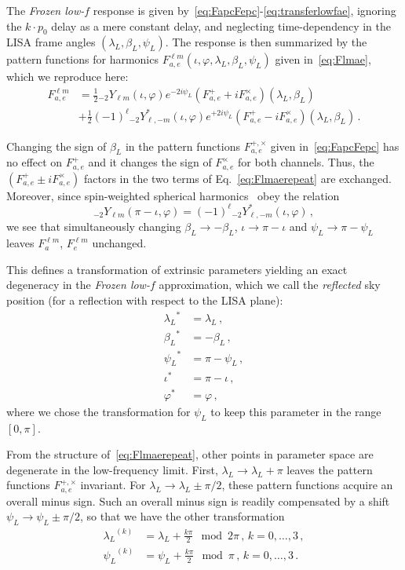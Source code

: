\documentclass[aps,showpacs,twocolumn,prd,superscriptaddress,nofootinbib]{revtex4-1}
\newcommand{\be}{\begin{equation}}
\newcommand{\ee}{\end{equation}}
\newcommand{\nn}{\nonumber}
\newcommand\betaL{{\beta_{L}}}
\newcommand\lambdaL{{\lambda_{L}}}
\newcommand\psiL{{\psi_{L}}}
\newcommand{\sYlm}{{}_{-2}Y_{\ell m}}
\newcommand{\sYlminusmstar}{{}_{-2}Y_{\ell, -m}^{*}}
\begin{document}
The \textit{Frozen low-$f$} response is given by~\eqref{eq:FapcFepc}-\eqref{eq:transferlowfae}, ignoring the $k\cdot p_{0}$ delay as a mere constant delay, and neglecting time-dependency in the LISA frame angles $(\lambda_{L}, \beta_{L}, \psi_{L})$. The response is then summarized by the pattern functions for harmonics $F^{\ell m}_{a,e} (\iota, \varphi, \lambda_{L}, \beta_{L}, \psi_{L})$ given in~\eqref{eq:Flmae}, which we reproduce here:
\begin{align}\label{eq:Flmaerepeat}
	F_{a,e}^{\ell m} &= \frac{1}{2} \sYlm (\iota, \varphi) e^{-2 i \psi_{L}} \left( F_{a,e}^{+} + i F_{a,e}^{\times}\right) (\lambda_{L}, \beta_{L}) \nn\\
	& + \frac{1}{2} (-1)^{\ell} \sYlminusmstar (\iota, \varphi) e^{+2 i \psi_{L}} \left( F_{a,e}^{+} - i F_{a,e}^{\times} \right) (\lambda_{L}, \beta_{L}) \,.
\end{align}

Changing the sign of $\beta_{L}$ in the pattern functions $F_{a,e}^{+,\times}$ given in~\eqref{eq:FapcFepc} has no effect on $F_{a,e}^{+}$ and it changes the sign of $F_{a,e}^{\times}$ for both channels.
Thus, the $\left( F_{a,e}^{+} \pm i F_{a,e}^{\times}\right)$ factors in the two terms of Eq.~\eqref{eq:Flmaerepeat} are exchanged.
Moreover, since spin-weighted spherical harmonics~\cite{Goldberg+67} obey the relation
\be
	\sYlm (\pi - \iota, \varphi) = (-1)^{\ell} \sYlminusmstar (\iota, \varphi) \,,
\ee
we see that simultaneously changing $\beta_{L} \rightarrow -\beta_{L}$, $\iota \rightarrow \pi-\iota$ and $\psi_{L} \rightarrow \pi - \psi_{L}$ leaves $F_{a}^{\ell m}$, $F_{e}^{\ell m}$ unchanged.

This defines a transformation of extrinsic parameters yielding an exact degeneracy in the \textit{Frozen low-$f$} approximation, which we call the \textit{reflected} sky position (for a reflection with respect to the LISA plane):
\begin{align} \label{eq:degenreflection}
	\lambdaL^{*} &= \lambdaL \,, \nn \\
	\betaL^{*} &= -\betaL \,, \nn \\
	\psiL^{*} &= \pi - \psiL \,, \nn \\
	\iota^{*} &= \pi - \iota \,, \nn \\
	\varphi^{*} &= \varphi \,,
\end{align}
where we chose the transformation for $\psiL$ to keep this parameter in the range $[0, \pi]$.

From the structure of~\eqref{eq:Flmaerepeat}, other points in parameter space are degenerate in the low-frequency limit. First, $\lambdaL \rightarrow \lambdaL + \pi$ leaves the pattern functions $F_{a,e}^{+,\times}$ invariant. For $\lambdaL \rightarrow \lambdaL \pm \pi/2$, these pattern functions acquire an overall minus sign. Such an overall minus sign is readily compensated by a shift $\psiL \rightarrow \psiL \pm \pi/2$, so that we have the other transformation
\begin{align} \label{eq:degenlambdapi2}
	\lambdaL^{(k)} &= \lambdaL + \frac{k \pi}{2} \mod 2\pi \,, \, k = 0, \dots, 3 \,, \nn \\
	\psiL^{(k)} &= \psiL + \frac{k \pi}{2} \mod \pi \,, \, k = 0, \dots, 3 \,.
\end{align}
\end{document}
